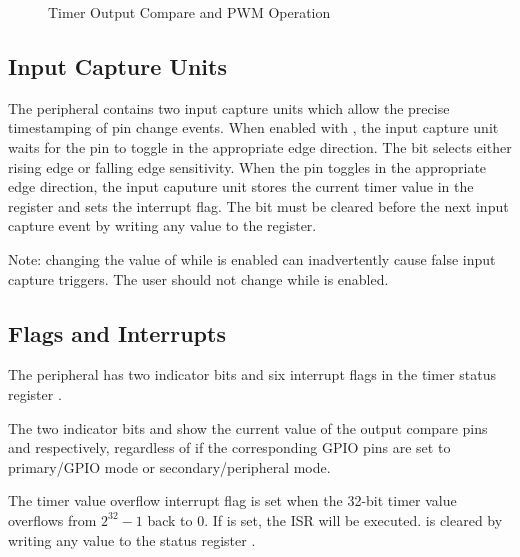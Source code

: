 \begin{figure}[htpb]
	
	\caption{Timer Output Compare and PWM Operation}
	\label{fig:timer-output-compare-operation}
\end{figure}



\subsection{Input Capture Units}

The  peripheral contains two input capture units which allow the precise timestamping of pin change events. When enabled with , the input capture unit waits for the  pin to toggle in the appropriate edge direction. The  bit selects either rising edge or falling edge sensitivity. When the pin toggles in the appropriate edge direction, the input caputure unit stores the current timer value in the  register and sets the  interrupt flag. The  bit must be cleared before the next input capture event by writing any value to the  register.

Note: changing the value of  while  is enabled can inadvertently cause false input capture triggers. The user should not change  while  is enabled.



\subsection{Flags and Interrupts}

The  peripheral has two indicator bits and six interrupt flags in the timer status register .

The two indicator bits  and  show the current value of the output compare pins  and  respectively, regardless of if the corresponding GPIO pins are set to primary/GPIO mode or secondary/peripheral mode.

The timer value overflow interrupt flag  is set when the 32-bit timer value overflows from $2^{32} - 1$ back to 0. If  is set, the  ISR will be executed.  is cleared by writing any value to the status register .

